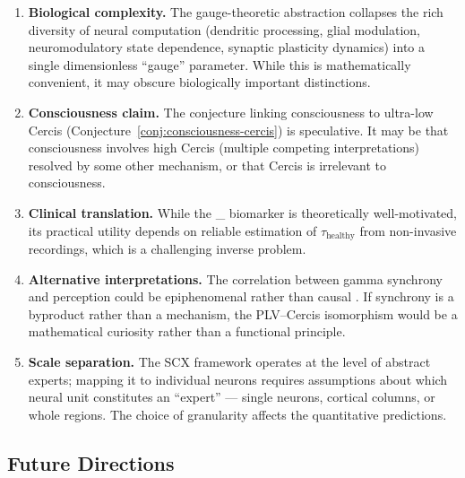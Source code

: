 \documentclass[12pt,a4paper]{article}
\theoremstyle{remark}
\newcommand{\Cercis}{\textsf{Cercis}}
\newcommand{\SchizoScore}{\mathcal{S}_{\text{schizo}}}
\begin{document}
\begin{enumerate}[label=(\roman*)]
    \item \textbf{Biological complexity.} The gauge-theoretic abstraction
          collapses the rich diversity of neural computation (dendritic
          processing, glial modulation, neuromodulatory state dependence,
          synaptic plasticity dynamics) into a single dimensionless ``gauge''
          parameter. While this is mathematically convenient, it may obscure
          biologically important distinctions.
    \item \textbf{Consciousness claim.} The conjecture linking consciousness
          to ultra-low \Cercis{} (Conjecture~\ref{conj:consciousness-cercis})
          is speculative. It may be that consciousness involves high \Cercis{}
          (multiple competing interpretations) resolved by some other mechanism,
          or that \Cercis{} is irrelevant to consciousness.
    \item \textbf{Clinical translation.} While the \SchizoScore{} biomarker is
          theoretically well-motivated, its practical utility depends on
          reliable estimation of $\tau_{\text{healthy}}$ from non-invasive
          recordings, which is a challenging inverse problem.
    \item \textbf{Alternative interpretations.} The correlation between
          gamma synchrony and perception could be epiphenomenal rather than
          causal \cite{ray2015neural, merker2013cortical}. If synchrony is a
          byproduct rather than a mechanism, the PLV--Cercis isomorphism
          would be a mathematical curiosity rather than a functional principle.
    \item \textbf{Scale separation.} The SCX framework operates at the level
          of abstract experts; mapping it to individual neurons requires
          assumptions about which neural unit constitutes an ``expert'' ---
          single neurons, cortical columns, or whole regions. The choice of
          granularity affects the quantitative predictions.
\end{enumerate}

\subsection{Future Directions}
\end{document}
